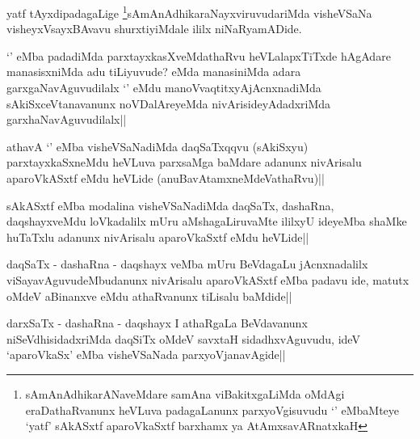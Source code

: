 \begin{artha}
yatf tAyxdipadagaLige \footnote{sAmAnAdhikarANaveMdare samAna viBakitxgaLiMda oMdAgi eraDathaRvanunx heVLuva padagaLanunx parxyoVgisuvudu `\stext' eMbaMteye `yatf' sAkASxtf aparoVkaSxtf barxhamx ya AtAmxsavARnatxkaH}sAmAnAdhikaraNayxviruvudariMda visheVSaNa visheyxVsayxBAvavu shurxtiyiMdale ililx niNaRyamADide.
\end{artha}


\begin{artha}
`\stext' eMba padadiMda parxtayxkasXveMdathaRvu heVLalapxTiTxde hAgAdare manasisxniMda adu tiLiyuvude? eMda manasiniMda adara garxgaNavAguvudilalx `\stext' eMdu manoVvaqtitxyAjAcnxnadiMda sAkiSxceVtanavanunx noVDalAreyeMda nivArisideyAdadxriMda garxhaNavAguvudilalx||
\end{artha}


\begin{artha}
athavA `\stext' eMba visheVSaNadiMda daqSaTxqqvu (sAkiSxyu) parxtayxkaSxneMdu heVLuva parxsaMga baMdare adanunx nivArisalu aparoVkASxtf eMdu heVLide (anuBavAtamxneMdeVathaRvu)||
\end{artha}


\begin{artha}
sAkASxtf eMba modalina visheVSaNadiMda daqSaTx, dashaRna, daqshayxveMdu loVkadalilx mUru aMshagaLiruvaMte ililxyU ideyeMba shaMke huTaTxlu adanunx nivArisalu aparoVkaSxtf eMdu heVLide||
\end{artha}

\begin{artha}
daqSaTx - dashaRna - daqshayx veMba mUru BeVdagaLu jAcnxnadalilx  viSayavAguvudeMbudanunx nivArisalu aparoVkASxtf eMba padavu ide, matutx oMdeV aBinanxve eMdu athaRvanunx tiLisalu baMdide||
\end{artha}


\begin{artha}
darxSaTx - dashaRna - daqshayx I athaRgaLa BeVdavanunx niSeVdhisidadxriMda daqSiTx oMdeV savxtaH sidadhxvAguvudu, ideV `aparoVkaSx' eMba visheVSaNada parxyoVjanavAgide||
\end{artha}


